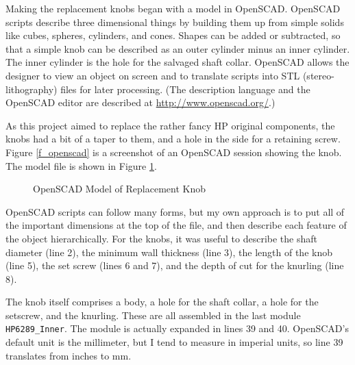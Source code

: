 \documentclass[12pt]{article}
\begin{document}
Making the replacement knobs began with a model in OpenSCAD. OpenSCAD
scripts describe three dimensional things by building them
up from simple solids like cubes, spheres, cylinders, and cones.
Shapes can be added or subtracted, so that a simple knob can be
described as an outer cylinder minus an inner cylinder.  The inner
cylinder is the hole for the salvaged shaft collar. OpenSCAD allows the designer to
view an object on screen and to translate scripts into STL (stereo-lithography)
files for later processing. (The description language and the OpenSCAD
editor are described at \url{http://www.openscad.org/}.)

As this project aimed to replace the rather fancy HP original components,
the knobs had a bit of a taper to them, and a hole in the side for a
retaining screw. Figure \ref{f_openscad} is a screenshot of an OpenSCAD
session showing the knob. The model file is shown in Figure \ref{f_knob_list}.

\begin{figure}[htbp]
  
  \caption{\label{f_knob_list}OpenSCAD Model of Replacement Knob}
  \end{figure}

OpenSCAD scripts can follow many forms, but my own approach is to put
all of the important dimensions at the top of the file, and then
describe each feature of the object hierarchically.  For the knobs,
it was useful to describe the shaft diameter (line 2), 
the minimum wall thickness (line 3), the length of the knob (line 5),
the set screw (lines 6 and 7), and the depth of cut for the knurling (line 8).

The knob itself comprises a body, a hole for the shaft collar, a hole
for the setscrew, and the knurling.  These are all assembled in the
last module {\tt HP6289\_Inner}. The module is actually expanded in
lines 39 and 40.  OpenSCAD's default unit is the millimeter, but I
tend to measure in imperial units, so line 39 translates from inches
to mm.
\end{document}

